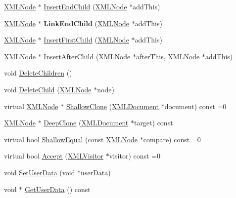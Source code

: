 \begin{DoxyCompactItemize}
\item 
\mbox{\hyperlink{classtinyxml2_1_1XMLNode}{X\+M\+L\+Node}} $\ast$ \mbox{\hyperlink{classtinyxml2_1_1XMLNode_aeb249ed60f4e8bfad3709151c3ee4286}{Insert\+End\+Child}} (\mbox{\hyperlink{classtinyxml2_1_1XMLNode}{X\+M\+L\+Node}} $\ast$add\+This)
\item 
\mbox{\label{classtinyxml2_1_1XMLNode_a663e3a5a378169fd477378f4d17a7649}} 
\mbox{\hyperlink{classtinyxml2_1_1XMLNode}{X\+M\+L\+Node}} $\ast$ {\bfseries Link\+End\+Child} (\mbox{\hyperlink{classtinyxml2_1_1XMLNode}{X\+M\+L\+Node}} $\ast$add\+This)
\item 
\mbox{\hyperlink{classtinyxml2_1_1XMLNode}{X\+M\+L\+Node}} $\ast$ \mbox{\hyperlink{classtinyxml2_1_1XMLNode_a8ff7dc071f3a1a6ae2ac25a37492865d}{Insert\+First\+Child}} (\mbox{\hyperlink{classtinyxml2_1_1XMLNode}{X\+M\+L\+Node}} $\ast$add\+This)
\item 
\mbox{\hyperlink{classtinyxml2_1_1XMLNode}{X\+M\+L\+Node}} $\ast$ \mbox{\hyperlink{classtinyxml2_1_1XMLNode_a85adb8f0b7477eec30f9a41d420b09c2}{Insert\+After\+Child}} (\mbox{\hyperlink{classtinyxml2_1_1XMLNode}{X\+M\+L\+Node}} $\ast$after\+This, \mbox{\hyperlink{classtinyxml2_1_1XMLNode}{X\+M\+L\+Node}} $\ast$add\+This)
\item 
void \mbox{\hyperlink{classtinyxml2_1_1XMLNode_a0360085cc54df5bff85d5c5da13afdce}{Delete\+Children}} ()
\item 
void \mbox{\hyperlink{classtinyxml2_1_1XMLNode_a363b6edbd6ebd55f8387d2b89f2b0921}{Delete\+Child}} (\mbox{\hyperlink{classtinyxml2_1_1XMLNode}{X\+M\+L\+Node}} $\ast$node)
\item 
virtual \mbox{\hyperlink{classtinyxml2_1_1XMLNode}{X\+M\+L\+Node}} $\ast$ \mbox{\hyperlink{classtinyxml2_1_1XMLNode_a8402cbd3129d20e9e6024bbcc0531283}{Shallow\+Clone}} (\mbox{\hyperlink{classtinyxml2_1_1XMLDocument}{X\+M\+L\+Document}} $\ast$document) const =0
\item 
\mbox{\hyperlink{classtinyxml2_1_1XMLNode}{X\+M\+L\+Node}} $\ast$ \mbox{\hyperlink{classtinyxml2_1_1XMLNode_a62c71b6bf8734b5424063b8d9a61c266}{Deep\+Clone}} (\mbox{\hyperlink{classtinyxml2_1_1XMLDocument}{X\+M\+L\+Document}} $\ast$target) const
\item 
virtual bool \mbox{\hyperlink{classtinyxml2_1_1XMLNode_a7ce18b751c3ea09eac292dca264f9226}{Shallow\+Equal}} (const \mbox{\hyperlink{classtinyxml2_1_1XMLNode}{X\+M\+L\+Node}} $\ast$compare) const =0
\item 
virtual bool \mbox{\hyperlink{classtinyxml2_1_1XMLNode_a81e66df0a44c67a7af17f3b77a152785}{Accept}} (\mbox{\hyperlink{classtinyxml2_1_1XMLVisitor}{X\+M\+L\+Visitor}} $\ast$visitor) const =0
\item 
void \mbox{\hyperlink{classtinyxml2_1_1XMLNode_a002978fc889cc011d143185f2377eca2}{Set\+User\+Data}} (void $\ast$user\+Data)
\item 
void $\ast$ \mbox{\hyperlink{classtinyxml2_1_1XMLNode_a7f0687574afa03bc479dc44f29db0afe}{Get\+User\+Data}} () const
\end{DoxyCompactItemize}

